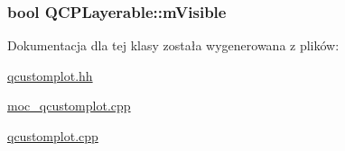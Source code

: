 \subsubsection[{\texorpdfstring{m\+Visible}{mVisible}}]{\setlength{\rightskip}{0pt plus 5cm}bool Q\+C\+P\+Layerable\+::m\+Visible\hspace{0.3cm}{\ttfamily [protected]}}\hypertarget{class_q_c_p_layerable_a62e3aed8427d6ce3ccf716f285106cb3}{}\label{class_q_c_p_layerable_a62e3aed8427d6ce3ccf716f285106cb3}


Dokumentacja dla tej klasy została wygenerowana z plików\+:\begin{DoxyCompactItemize}
\item 
\hyperlink{qcustomplot_8hh}{qcustomplot.\+hh}\item 
\hyperlink{moc__qcustomplot_8cpp}{moc\+\_\+qcustomplot.\+cpp}\item 
\hyperlink{qcustomplot_8cpp}{qcustomplot.\+cpp}\end{DoxyCompactItemize}
